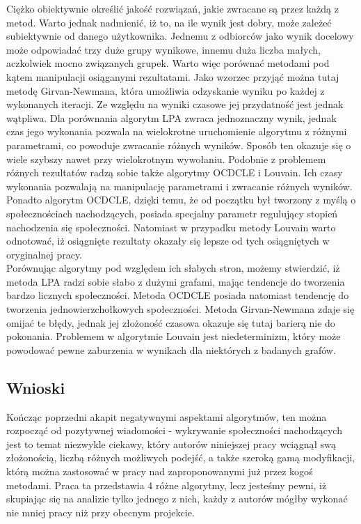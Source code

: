 \documentclass{article}
\begin{document}
Ciężko obiektywnie określić jakość rozwiązań, jakie zwracane są przez każdą z metod. Warto jednak nadmienić, iż to, na ile wynik jest dobry, może zależeć subiektywnie od danego użytkownika. Jednemu z odbiorców jako wynik docelowy może odpowiadać trzy duże grupy wynikowe, innemu duża liczba małych, aczkolwiek mocno związanych grupek. Warto więc porównać metodami pod kątem manipulacji osiąganymi rezultatami. Jako wzorzec przyjąć można tutaj metodę Girvan-Newmana, która umożliwia odzyskanie wyniku po każdej z wykonanych iteracji. Ze względu na wyniki czasowe jej przydatność jest jednak wątpliwa. Dla porównania algorytm LPA zwraca jednoznaczny wynik, jednak czas jego wykonania pozwala na wielokrotne uruchomienie algorytmu z różnymi parametrami, co powoduje zwracanie różnych wyników. Sposób ten okazuje się o wiele szybszy nawet przy wielokrotnym wywołaniu. Podobnie z problemem różnych rezultatów radzą sobie także algorytmy OCDCLE i Louvain. Ich czasy wykonania pozwalają na manipulację parametrami i zwracanie różnych wyników. Ponadto algorytm OCDCLE, dzięki temu, że od początku był tworzony z myślą o społecznościach nachodzących, posiada specjalny parametr regulujący stopień nachodzenia się społeczności. Natomiast w przypadku metody Louvain warto odnotować, iż osiągnięte rezultaty okazały się lepsze od tych osiągniętych w oryginalnej pracy.\\

Porównując algorytmy pod względem ich słabych stron, możemy stwierdzić, iż metoda LPA radzi sobie słabo z dużymi grafami, mając tendencje do tworzenia bardzo licznych społeczności. Metoda OCDCLE posiada natomiast tendencję do tworzenia jednowierzchołkowych społeczności. Metoda Girvan-Newmana zdaje się omijać te błędy, jednak jej złożoność czasowa okazuje się tutaj barierą nie do pokonania. Problemem w algorytmie Louvain jest niedeterminizm, który może powodować pewne zaburzenia w wynikach dla niektórych z badanych grafów. \\
 
\subsection{Wnioski}
Kończąc poprzedni akapit negatywnymi aspektami algorytmów, ten można rozpocząć od pozytywnej wiadomości - wykrywanie społeczności nachodzących jest to temat niezwykle ciekawy, który autorów niniejszej pracy wciągnął swą złożonością, liczbą różnych możliwych podejść, a także szeroką gamą modyfikacji, którą można zastosować w pracy nad zaproponowanymi już przez kogoś metodami. Praca ta przedstawia 4 różne algorytmy, lecz jesteśmy pewni, iż skupiając się na analizie tylko jednego z nich, każdy z autorów mógłby wykonać nie mniej pracy niż przy obecnym projekcie. \\
\end{document}
